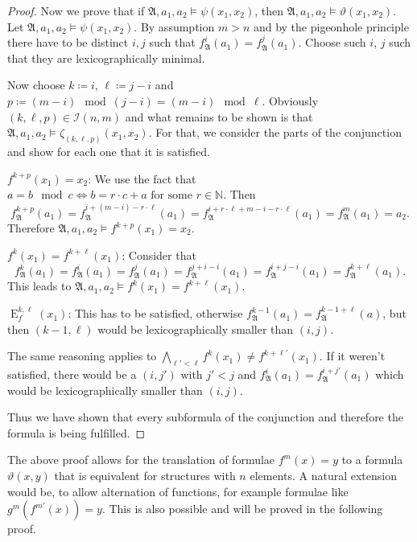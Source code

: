 \documentclass[a4paper,11pt,DIV=15]{scrartcl} %
\theoremstyle{plain}
\theoremstyle{definition}
\renewcommand{\theta}{\vartheta}
\begin{document}
\begin{proof}
	Now we prove that if $\mathfrak A,a_1,a_2 \models \psi(x_1,x_2)$, then $\mathfrak A,a_1,a_2 \models \theta(x_1,x_2)$. 
	Let $\mathfrak A,a_1,a_2\models \psi(x_1,x_2)$. By assumption $m>n$ and by the pigeonhole principle there have to be distinct $i, j$ such that $f_{\mathfrak A}^{i}(a_1)=f_{\mathfrak A}^{j}(a_1)$.
	Choose such $i$, $j$ such that they are lexicographically minimal.
	
	Now choose $k\coloneqq i$, $\ell \coloneqq j-i$ and $p\coloneqq (m-i) \mod (j-i)= (m-i) \mod \ell$.
	Obviously $(k,\ell,p)\in\mathcal I(n,m)$ and what remains to be shown is that $\mathfrak A,a_1,a_2\models \zeta_{(k,\ell,p)}(x_1,x_2)$.
	For that, we consider the parts of the conjunction and show for each one that it is satisfied.
	
	$f^{k+p}(x_1)=x_2$:
	We use the fact that $a= b \mod c \Leftrightarrow b = r\cdot c +a \text{ for some } r\in \mathbb N$.
	Then
	$$f_{\mathfrak A}^{k+p}(a_1)=f_{\mathfrak A}^{i+(m-i)-r\cdot \ell}(a_1)=f_{\mathfrak A}^{i+r\cdot \ell + m -i - r\cdot \ell}(a_1)=f_{\mathfrak A}^{m}(a_1)=a_2.$$
	Therefore $\mathfrak A,a_1,a_2\models f^{k+p}(x_1)=x_2$.
	
	$f^{k}(x_1)=f^{k+\ell}(x_1)$:
	Consider that
	$$f_{\mathfrak A}^{k}(a_1)=f_{\mathfrak A}^{i}(a_1)=f_{\mathfrak A}^{j}(a_1)=f_{\mathfrak A}^{j+i-i}(a_1)=f_{\mathfrak A}^{i+j-i}(a_1)=f_{\mathfrak A}^{k+\ell}(a_1).$$
	This leads to $\mathfrak A,a_1,a_2\models f^{k}(x_1)=f^{k+\ell}(x_1)$.
	
	$\operatorname{E}^{k,\ell}_f(x_1)$:
	This has to be satisfied, otherwise $f_{\mathfrak A}^{k-1}(a_1)=f_{\mathfrak A}^{k-1+\ell}(a)$, but then $(k-1,\ell)$ would be lexicographically smaller than $(i,j)$.
	
	The same reasoning applies to $\bigwedge_{\ell'<\ell}f^{k}(x_1)\neq f^{k+\ell'}(x_1)$. 
	If it weren't satisfied, there would be a $(i,j')$ with $j'<j$ and $f_{\mathfrak A}^{i}(a_1)=f_{\mathfrak A}^{i+j'}(a_1)$ which would be lexicographically smaller than $(i,j)$.
	
	Thus we have shown that every subformula of the conjunction and therefore the formula is being fulfilled.
\end{proof}

The above proof allows for the translation of formulae $f^m(x)=y$ to a formula $\theta(x,y)$ that is equivalent for structures with $n$ elements.
A natural extension would be, to allow alternation of functions, for example formulae like $g^m(f^{m'}(x))=y$.
This is also possible and will be proved in the following proof.
\end{document}
